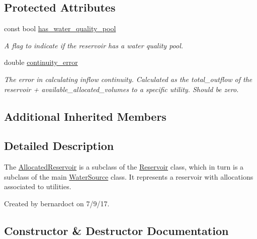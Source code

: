 \subsection*{Protected Attributes}
\begin{DoxyCompactItemize}
\item 
const bool \mbox{\hyperlink{classAllocatedReservoir_af6a1924f60de19b7f77781af0419c39b}{has\+\_\+water\+\_\+quality\+\_\+pool}}
\begin{DoxyCompactList}\small\item\em A flag to indicate if the reservoir has a water quality pool. \end{DoxyCompactList}\item 
double \mbox{\hyperlink{classAllocatedReservoir_ae34d7123ff096d676609e32ba4b83e47}{continuity\+\_\+error}}
\begin{DoxyCompactList}\small\item\em The error in calculating inflow continuity. Calculated as the total\+\_\+outflow of the reservoir + available\+\_\+allocated\+\_\+volumes to a specific utility. Should be zero. \end{DoxyCompactList}\end{DoxyCompactItemize}
\subsection*{Additional Inherited Members}


\subsection{Detailed Description}
The {\ttfamily \mbox{\hyperlink{classAllocatedReservoir}{Allocated\+Reservoir}}} is a subclass of the {\ttfamily \mbox{\hyperlink{classReservoir}{Reservoir}}} class, which in turn is a subclass of the main {\ttfamily \mbox{\hyperlink{classWaterSource}{Water\+Source}}} class. It represents a reservoir with allocations associated to utilities. 

Created by bernardoct on 7/9/17. 

\subsection{Constructor \& Destructor Documentation}
\mbox{\label{classAllocatedReservoir_a0b2d620a1d1fe9a9fe053269f35a9a70}} 

